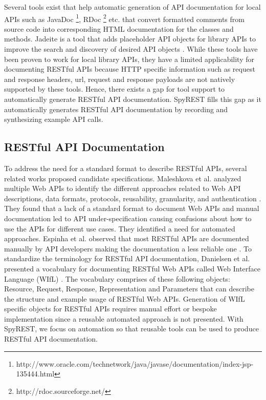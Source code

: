 \documentclass[conference]{IEEEtran}
\begin{document}
Several tools exist that help automatic generation of API documentation for local APIs such as JavaDoc \footnote{http://www.oracle.com/technetwork/java/javase/documentation/index-jsp-135444.html}, RDoc \footnote{http://rdoc.sourceforge.net/} etc. that convert formatted comments from source code into corresponding HTML documentation for the classes and methods. Jadeite is a tool that adds placeholder API objects for library APIs to improve the search and discovery of desired API objects \cite{Jadeite}. While these tools have been proven to work for local library APIs, they have a limited applicability for documenting RESTful APIs because HTTP specific information such as request and response headers, url, request and response payloads are not natively supported by these tools. Hence, there exists a gap for tool support to automatically generate RESTful API documentation. SpyREST fills this gap as it automatically generates RESTful API documentation by recording and synthesizing example API calls.

\subsection{RESTful API Documentation} %
\label{sub:restful_api_documentation}

To address the need for a standard format to describe RESTful APIs, several related works proposed candidate specifications. Maleshkova et al. analyzed multiple Web APIs to identify the different approaches related to Web API descriptions, data formats, protocols, reusability, granularity, and authentication \cite{Maleshkova_investigating}. They found that a lack of a standard format to document Web APIs and manual documentation led to API under-specification causing confusions about how to use the APIs for different use cases. They identified a need for automated approaches. Espinha et al. observed that most RESTful APIs are documented manually by API developers making the documentation a less reliable one \cite{Espinha_web}. To standardize the terminology for RESTful API documentation, Danielsen et al. presented a vocabulary for documenting RESTful Web APIs called Web Interface Language (WIfL) \cite{Danielsen_validation}. The vocabulary comprises of these following objects: Resource, Request, Response, Representation and Parameters that can describe the structure and example usage of RESTful Web APIs. Generation of WIfL specific objects for RESTful APIs requires manual effort or bespoke implementation since a reusable automated approach is not presented. With SpyREST, we focus on automation so that reusable tools can be used to produce RESTful API documentation.
\end{document}
